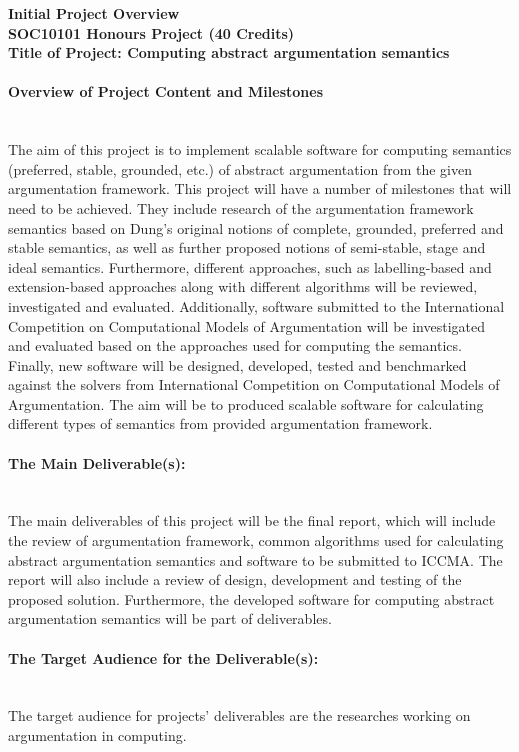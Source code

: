 \textbf{Initial Project Overview} \\
\textbf{SOC10101 Honours Project (40 Credits)}             \\                                          
\textbf{Title of Project: Computing abstract argumentation semantics }\\

\paragraph{Overview of Project Content and Milestones} \mbox{}\\
The aim of this project is to implement scalable software for computing semantics (preferred, stable, grounded, etc.) of abstract argumentation from the given argumentation framework. This project will have a number of milestones that will need to be achieved. They include research of the argumentation framework semantics based on Dung’s original notions of complete, grounded, preferred and stable semantics, as well as further proposed notions of semi-stable, stage and ideal semantics. Furthermore, different approaches, such as labelling-based and extension-based approaches along with different algorithms will be reviewed, investigated and evaluated. Additionally, software submitted to the International Competition on Computational Models of Argumentation will be investigated and evaluated based on the approaches used for computing the semantics. Finally, new software will be designed, developed, tested and benchmarked against the solvers from International Competition on Computational Models of Argumentation. The aim will be to produced scalable software for calculating different types of semantics from provided argumentation framework.

\paragraph{The Main Deliverable(s):} \mbox{}\\
The main deliverables of this project will be the final report, which will include the review of argumentation framework, common algorithms used for calculating abstract argumentation semantics and software to be submitted to ICCMA. The report will also include a review of design, development and testing of the proposed solution. Furthermore, the developed software for computing abstract argumentation semantics will be part of deliverables.

\paragraph{The Target Audience for the Deliverable(s):} \mbox{}\\
The target audience for projects’ deliverables are the researches working on argumentation in computing.

